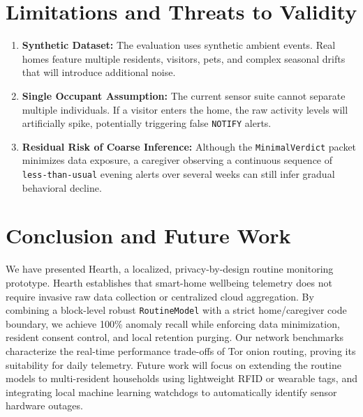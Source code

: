 \documentclass[conference]{IEEEtran}
\begin{document}
\section{Limitations and Threats to Validity}
\begin{enumerate}
  \item \textbf{Synthetic Dataset:} The evaluation uses synthetic ambient events. Real homes feature multiple residents, visitors, pets, and complex seasonal drifts that will introduce additional noise.
  \item \textbf{Single Occupant Assumption:} The current sensor suite cannot separate multiple individuals. If a visitor enters the home, the raw activity levels will artificially spike, potentially triggering false \texttt{NOTIFY} alerts.
  \item \textbf{Residual Risk of Coarse Inference:} Although the \texttt{MinimalVerdict} packet minimizes data exposure, a caregiver observing a continuous sequence of \texttt{less-than-usual} evening alerts over several weeks can still infer gradual behavioral decline.
\end{enumerate}

\section{Conclusion and Future Work}
We have presented Hearth, a localized, privacy-by-design routine monitoring prototype. Hearth establishes that smart-home wellbeing telemetry does not require invasive raw data collection or centralized cloud aggregation. By combining a block-level robust \texttt{RoutineModel} with a strict home/caregiver code boundary, we achieve 100\% anomaly recall while enforcing data minimization, resident consent control, and local retention purging. Our network benchmarks characterize the real-time performance trade-offs of Tor onion routing, proving its suitability for daily telemetry. Future work will focus on extending the routine models to multi-resident households using lightweight RFID or wearable tags, and integrating local machine learning watchdogs to automatically identify sensor hardware outages.
\end{document}
